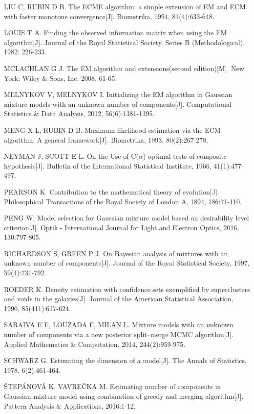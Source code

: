 \documentclass[a4paper,12pt,openany,oneside,utf-8]{ctexbook}
\begin{document}
\begin{enumerate}[{[}1{]}]
\item 	LIU C, RUBIN D B. The ECME algorithm: a simple extension of EM and ECM with faster monotone convergence[J]. Biometrika, 1994, 81(4):633-648.
\item 	LOUIS T A. Finding the observed information matrix when using the EM algorithm[J]. Journal of the Royal Statistical Society. Series B (Methodological), 1982: 226-233.
\item 	MCLACHLAN G J. The EM algorithm and extensions(second edition)[M]. New York: Wiley \& Sons, Inc, 2008, 61-65.
\item 	MELNYKOV V, MELNYKOV I. Initializing the EM algorithm in Gaussian mixture models with an unknown number of components[J]. Computational Statistics \& Data Analysis, 2012, 56(6):1381-1395.
\item 	MENG X L, RUBIN D B. Maximum likelihood estimation via the ECM algorithm: A general framework[J]. Biometrika, 1993, 80(2):267-278.
\item 	NEYMAN J, SCOTT E L. On the Use of C($\alpha$) optimal tests of composite hypothesis[J]. Bulletin of the International Statistical Institute, 1966, 41(1):477--497.
\item 	PEARSON K. Contribution to the mathematical theory of evolution[J]. Philosophical Transactions of the Royal Society of London A, 1894, 186:71-110.
\item 	PENG W. Model selection for Gaussian mixture model based on desirability level criterion[J]. Optik - International Journal for Light and Electron Optics, 2016, 130:797-805.
\item 	RICHARDSON S, GREEN P J. On Bayesian analysis of mixtures with an unknown number of components[J]. Journal of the Royal Statistical Society, 1997, 59(4):731-792.
\item 	ROEDER K. Density estimation with confidence sets exemplified by superclusters and voids in the galaxies[J]. Journal of the American Statistical Association, 1990, 85(411):617-624.
\item 	SARAIVA E F, LOUZADA F, MILAN L. Mixture models with an unknown number of components via a new posterior split–merge MCMC algorithm[J]. Applied Mathematics \& Computation, 2014, 244(2):959-975.
\item 	SCHWARZ G. Estimating the dimension of a model[J]. The Annals of Statistics, 1978, 6(2):461-464.
\item 	ŠTEPÁNOVÁ K, VAVREČKA M. Estimating number of components in Gaussian mixture model using combination of greedy and merging algorithm[J]. Pattern Analysis \& Applications, 2016:1-12.

\end{enumerate}
\end{document}
